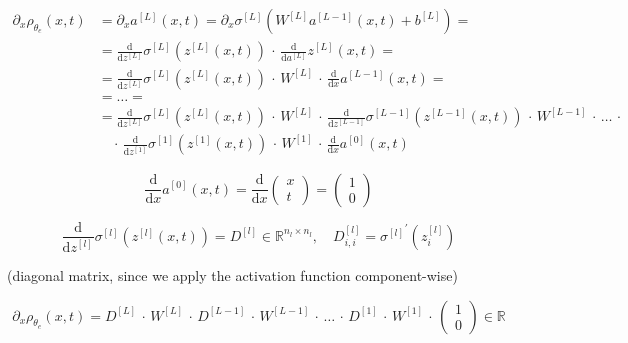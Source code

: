 \begin{align*}
    \partial_x \rho_{\theta_e}(x, t) & =  \partial_x a^{[L]}(x,t) = \partial_x \sigma^{[L]} (W^{[L]} a^{[L-1]}(x,t) + b^{[L]}) = \\
    & =  \frac{\mathrm{d}}{\mathrm{d} z^{[L]}} \sigma^{[L]} (z^{[L]}(x,t)) \, \cdot \, \frac{\mathrm{d}}{\mathrm{d} a^{[L]}} z^{[L]}(x,t) = \\ 
    & =  \frac{\mathrm{d}}{\mathrm{d} z^{[L]}} \sigma^{[L]} (z^{[L]}(x,t)) \, \cdot \, W^{[L]} \, \cdot \, \frac{\mathrm{d}}{\mathrm{d} x} a^{[L-1]}(x,t) = \\
    & =  \ldots = \\
    & =  \frac{\mathrm{d}}{\mathrm{d} z^{[L]}} \sigma^{[L]} (z^{[L]}(x,t)) \, \cdot \, W^{[L]} \, \cdot \, \frac{\mathrm{d}}{\mathrm{d} z^{[L-1]}} \sigma^{[L-1]} (z^{[L-1]}(x,t)) \, \cdot \, W^{[L-1]} \, \cdot \, \ldots \, \cdot \\
    & \quad \cdot \, \frac{\mathrm{d}}{\mathrm{d} z^{[1]}} \sigma^{[1]} (z^{[1]}(x,t)) \, \cdot \, W^{[1]} \, \cdot \,\frac{\mathrm{d}}{\mathrm{d} x} a^{[0]}(x,t) 
\end{align*}
    
\begin{equation*}
    \frac{\mathrm{d}}{\mathrm{d} x} a^{[0]}(x,t) = \frac{\mathrm{d}}{\mathrm{d} x} \begin{pmatrix} x \\ t \end{pmatrix} = \begin{pmatrix} 1 \\ 0 \end{pmatrix}
\end{equation*}

\begin{equation*}
    \frac{\mathrm{d}}{\mathrm{d} z^{[l]}} \sigma^{[l]} (z^{[l]}(x,t)) = D^{[l]} \in \mathbb{R}^{n_l \times n_l}, \quad D_{i, i}^{[l]} = {\sigma^{[l]}}^{\prime} (z_{i}^{[l]})
\end{equation*}

(diagonal matrix, since we apply the activation function component-wise)

\begin{equation*}
    \partial_x \rho_{\theta_e}(x, t) = D^{[L]} \, \cdot \, W^{[L]} \, \cdot \, D^{[L-1]} \, \cdot \, W^{[L-1]} \, \cdot \, \ldots \, \cdot \, D^{[1]} \, \cdot \, W^{[1]} \, \cdot \, \begin{pmatrix} 1 \\ 0 \end{pmatrix} \in \mathbb{R}
\end{equation*}

